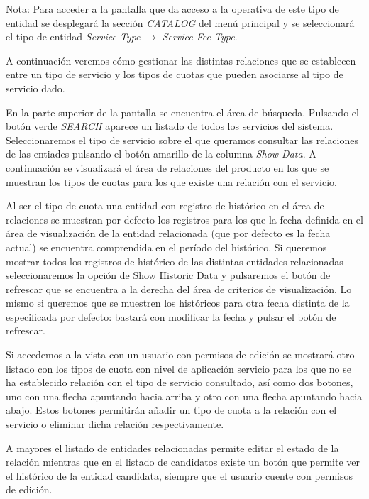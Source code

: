 Nota: Para acceder a la pantalla que da acceso a la operativa de este tipo de entidad se desplegará la sección \emph{CATALOG} del menú principal y se seleccionará el tipo de entidad \emph{Service Type} $\rightarrow$  \emph{Service Fee Type}.


A continuación veremos cómo gestionar las distintas relaciones que se establecen entre un tipo de servicio y los tipos de cuotas que pueden asociarse al tipo de servicio dado.


En la parte superior de la pantalla se encuentra el área de búsqueda. Pulsando el botón verde \emph{SEARCH} aparece un listado de todos los servicios del sistema. Seleccionaremos el tipo de servicio sobre el que queramos consultar las relaciones de las entiades pulsando el botón amarillo de la columna \emph{Show Data}. A continuación se visualizará el área de relaciones del producto en los que se muestran los tipos de cuotas para los que existe una relación con el servicio.

Al ser el tipo de cuota una entidad con registro de histórico en el área de relaciones se muestran por defecto los registros para los que la fecha definida en el área de visualización de la entidad relacionada (que por defecto es la fecha actual) se encuentra comprendida en el período del histórico. Si queremos mostrar todos los registros de histórico de las distintas entidades relacionadas seleccionaremos la opción de Show Historic Data y pulsaremos el botón de refrescar que se encuentra a la derecha del área de criterios de visualización. Lo mismo si queremos que se muestren los históricos para otra fecha distinta de la especificada por defecto: bastará con modificar la fecha y pulsar el botón de refrescar.

Si accedemos a la vista con un usuario con permisos de edición se mostrará otro listado con los tipos de cuota con nivel de aplicación servicio para los que no se ha establecido relación con el tipo de servicio consultado, así como dos botones, uno con una flecha apuntando hacia arriba y otro con una flecha apuntando hacia abajo. Estos botones permitirán añadir un tipo de cuota a la relación con el servicio o eliminar dicha relación respectivamente. 

A mayores el listado de entidades relacionadas permite editar el estado de la relación mientras que en el listado de candidatos existe un botón que permite ver el histórico de la entidad candidata, siempre que el usuario cuente con permisos de edición.



